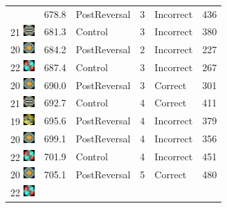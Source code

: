 \documentclass[]{article}
\begin{document}
\begin{longtable}[]{@{}lrlrll@{}}
& 678.8 & PostReversal & 3 & Incorrect & 436\tabularnewline
21
\includegraphics[width=0.16670in,height=0.16670in]{../ReversalLearning_20130621/images/abs21.jpg}
& 681.3 & Control & 3 & Incorrect & 380\tabularnewline
20
\includegraphics[width=0.16670in,height=0.16670in]{../ReversalLearning_20130621/images/abs20.jpg}
& 684.2 & PostReversal & 2 & Incorrect & 227\tabularnewline
22
\includegraphics[width=0.16670in,height=0.16670in]{../ReversalLearning_20130621/images/abs22.jpg}
& 687.4 & Control & 3 & Incorrect & 267\tabularnewline
20
\includegraphics[width=0.16670in,height=0.16670in]{../ReversalLearning_20130621/images/abs20.jpg}
& 690.0 & PostReversal & 3 & Correct & 301\tabularnewline
21
\includegraphics[width=0.16670in,height=0.16670in]{../ReversalLearning_20130621/images/abs21.jpg}
& 692.7 & Control & 4 & Correct & 411\tabularnewline
19
\includegraphics[width=0.16670in,height=0.16670in]{../ReversalLearning_20130621/images/abs19.jpg}
& 695.6 & PostReversal & 4 & Incorrect & 379\tabularnewline
20
\includegraphics[width=0.16670in,height=0.16670in]{../ReversalLearning_20130621/images/abs20.jpg}
& 699.1 & PostReversal & 4 & Incorrect & 356\tabularnewline
22
\includegraphics[width=0.16670in,height=0.16670in]{../ReversalLearning_20130621/images/abs22.jpg}
& 701.9 & Control & 4 & Incorrect & 451\tabularnewline
20
\includegraphics[width=0.16670in,height=0.16670in]{../ReversalLearning_20130621/images/abs20.jpg}
& 705.1 & PostReversal & 5 & Correct & 480\tabularnewline
22
\includegraphics[width=0.16670in,height=0.16670in]{../ReversalLearning_20130621/images/abs22.jpg}

\end{longtable}
\end{document}
